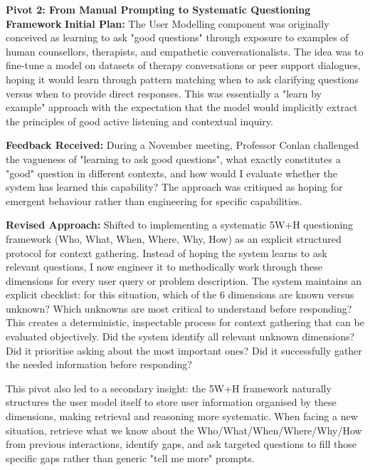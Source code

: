\documentclass[a4paper,oneside,12pt]{book}
\numberwithin{equation}{chapter} %
\begin{document}
\par
\textbf{Pivot 2: From Manual Prompting to Systematic Questioning Framework}
\textbf{Initial Plan:} The User Modelling component was originally conceived as learning to ask "good questions" through exposure to examples of human counsellors, therapists, and empathetic conversationalists. The idea was to fine-tune a model on datasets of therapy conversations or peer support dialogues, hoping it would learn through pattern matching when to ask clarifying questions versus when to provide direct responses. This was essentially a "learn by example" approach with the expectation that the model would implicitly extract the principles of good active listening and contextual inquiry.

\textbf{Feedback Received:} During a November meeting, Professor Conlan challenged the vagueness of "learning to ask good questions", what exactly constitutes a "good" question in different contexts, and how would I evaluate whether the system has learned this capability? The approach was critiqued as hoping for emergent behaviour rather than engineering for specific capabilities.

\textbf{Revised Approach:} Shifted to implementing a systematic 5W+H questioning framework (Who, What, When, Where, Why, How) as an explicit structured protocol for context gathering. Instead of hoping the system learns to ask relevant questions, I now engineer it to methodically work through these dimensions for every user query or problem description. The system maintains an explicit checklist: for this situation, which of the 6 dimensions are known versus unknown? Which unknowns are most critical to understand before responding? This creates a deterministic, inspectable process for context gathering that can be evaluated objectively. Did the system identify all relevant unknown dimensions? Did it prioritise asking about the most important ones? Did it successfully gather the needed information before responding?
\par
This pivot also led to a secondary insight: the 5W+H framework naturally structures the user model itself to store user information organised by these dimensions, making retrieval and reasoning more systematic. When facing a new situation, retrieve what we know about the Who/What/When/Where/Why/How from previous interactions, identify gaps, and ask targeted questions to fill those specific gaps rather than generic "tell me more" prompts.

%
%
%
%
%
%

%
\end{document}
